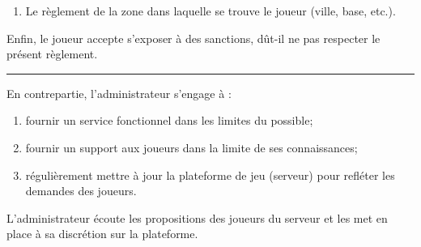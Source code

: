 \begin{flushleft}
\begin{enumerate}
		\item Le r\`eglement de la zone dans laquelle se trouve le joueur (ville, base, etc.).
	\end{enumerate}
	Enfin, le joueur accepte s'exposer \`a des sanctions, d\^ut-il ne pas respecter le pr\'esent r\`eglement.
	\noindent\rule{\textwidth}{1pt}
	En contrepartie, l'administrateur s'engage \`a :
	\begin{enumerate}
		\item fournir un service fonctionnel dans les limites du possible;
		\item fournir un support aux joueurs dans la limite de ses connaissances;
		\item r\'eguli\`erement mettre \`a jour la plateforme de jeu (serveur) pour refl\'eter les demandes des joueurs.
	\end{enumerate}
	L'administrateur \'ecoute les propositions des joueurs du serveur et les met en place \`a sa discr\'etion sur la plateforme.
\end{flushleft}
